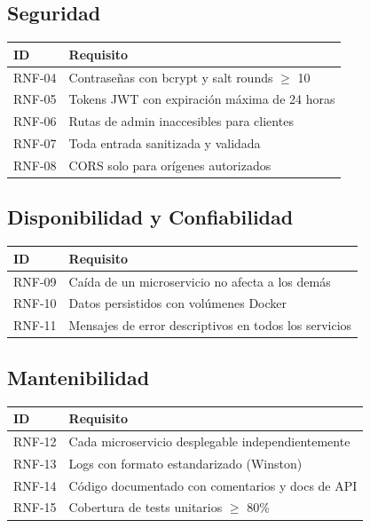 \documentclass[12pt,a4paper]{article}
\begin{document}
\subsection{Seguridad}
\begin{table}[H]
\centering
\begin{tabularx}{\textwidth}{lX}
\toprule
\textbf{ID} & \textbf{Requisito} \\
\midrule
RNF-04 & Contrase\~nas con bcrypt y salt rounds $\geq$ 10 \\
RNF-05 & Tokens JWT con expiraci\'on m\'axima de 24 horas \\
RNF-06 & Rutas de admin inaccesibles para clientes \\
RNF-07 & Toda entrada sanitizada y validada \\
RNF-08 & CORS solo para or\'igenes autorizados \\
\bottomrule
\end{tabularx}
\end{table}

\subsection{Disponibilidad y Confiabilidad}
\begin{table}[H]
\centering
\begin{tabularx}{\textwidth}{lX}
\toprule
\textbf{ID} & \textbf{Requisito} \\
\midrule
RNF-09 & Ca\'ida de un microservicio no afecta a los dem\'as \\
RNF-10 & Datos persistidos con vol\'umenes Docker \\
RNF-11 & Mensajes de error descriptivos en todos los servicios \\
\bottomrule
\end{tabularx}
\end{table}

\subsection{Mantenibilidad}
\begin{table}[H]
\centering
\begin{tabularx}{\textwidth}{lX}
\toprule
\textbf{ID} & \textbf{Requisito} \\
\midrule
RNF-12 & Cada microservicio desplegable independientemente \\
RNF-13 & Logs con formato estandarizado (Winston) \\
RNF-14 & C\'odigo documentado con comentarios y docs de API \\
RNF-15 & Cobertura de tests unitarios $\geq$ 80\% \\
\bottomrule
\end{tabularx}
\end{table}
\end{document}
